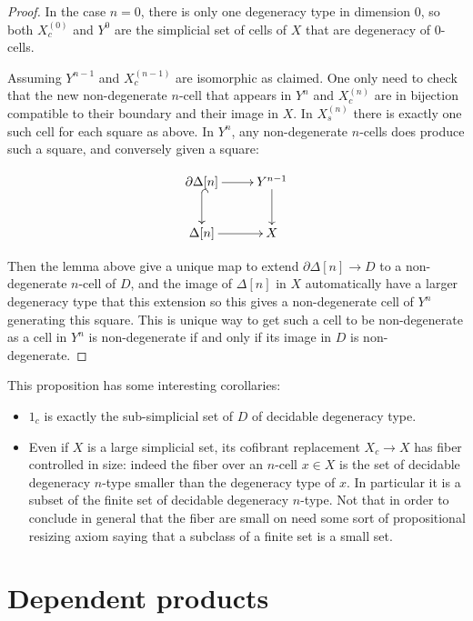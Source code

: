 \documentclass[reqno,10pt,a4paper,oneside,draft]{amsart}
\begin{document}
\begin{proof}
In the case $n=0$, there is only one degeneracy type in dimension $0$, so both $X^{(0)}_c$ and $Y^0$ are the simplicial set of cells of $X$ that are degeneracy of $0$-cells.

Assuming $Y^{n-1}$ and $X^{(n-1)}_c$ are isomorphic as claimed. One only need to check that the new non-degenerate $n$-cell that appears in $Y^{n}$ and $X^{(n)}_c$ are in bijection compatible to their boundary and their image in $X$.
In $X^{(n)}_s$ there is exactly one such cell for each square as above. In $Y^{n}$, any non-degenerate $n$-cells does produce such a square, and conversely given a square:

\[ \xymatrix{\partial \Delta[n]  \ar[r] \ar@{^{(}->}[d] & Y^{n-1} \ar[d] \\ \Delta[n]  \ar[r] & X} \]

Then the lemma above give a unique map to extend $\partial \Delta[n] \rightarrow D$ to a non-degenerate $n$-cell of $D$, and the image of $\Delta[n]$ in $X$ automatically have a larger degeneracy type that this extension so this gives a non-degenerate cell of $Y^{n}$ generating this square. This is unique way to get such a cell to be non-degenerate as a cell in $Y^n$ is non-degenerate if and only if its image in $D$ is non-degenerate.

\end{proof}


This proposition has some interesting corollaries:

\begin{itemize}

\item $1_c$ is exactly the sub-simplicial set of $D$ of decidable degeneracy type.

\item Even if $X$ is a large simplicial set, its cofibrant replacement $X_c \rightarrow X$ has fiber controlled in size: indeed the fiber over an $n$-cell $x \in X$ is the set of decidable degeneracy $n$-type smaller than the degeneracy type of $x$. In particular it is a subset of the finite set of decidable degeneracy $n$-type. Not that in order to conclude in general that the fiber are small on need some sort of propositional resizing axiom saying that a subclass of a finite set is a small set.

\end{itemize}

\newpage

\section{Dependent products}
\end{document}
